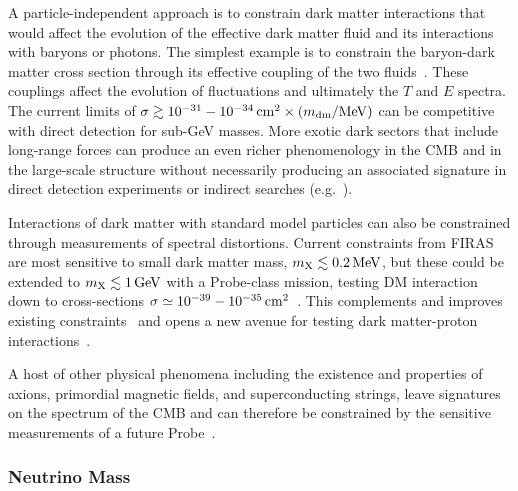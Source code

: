 A particle-independent approach is to constrain dark matter interactions that would 
affect the evolution of the effective dark matter fluid and its interactions with baryons or photons.  The simplest example is 
to constrain the baryon-dark matter cross section through its effective coupling of the two fluids~\cite{Dvorkin:2013cea}.  
These couplings affect the evolution of fluctuations and ultimately the $T$ and $E$ spectra. The current limits of $\sigma \gtrsim 10^{-31}-10^{-34}\,{\rm cm}^2 \times (m_{\rm dm} / {\rm MeV})$ can be competitive with direct detection for sub-GeV masses.  
More exotic dark sectors that include long-range forces can produce an even richer phenomenology in the CMB and in the large-scale structure 
without necessarily producing an associated signature in direct detection experiments or 
indirect searches (e.g.~\cite{Cyr-Racine:2013fsa,Buen-Abad:2015ova,Lesgourgues:2015wza}). 

Interactions of dark matter with standard model particles can also be constrained through 
measurements of spectral distortions\cite{Yacine2015DM}. 
Current constraints from FIRAS are most sensitive to small dark matter
mass, $m_{\rm X}\lesssim 0.2\,{\rm MeV}$, but these could be extended to $m_{\rm X}\lesssim 1\,{\rm GeV}$ with a 
Probe-class mission, testing DM interaction down to cross-sections 
$\sigma\simeq 10^{-39}-10^{-35}\,{\rm cm}^2$~\cite{Yacine2015DM}. This complements and improves 
existing constraints~\cite{Essig2012PhRvL.109b1301E, Boehm2014MNRAS.445L..31B} 
and opens a new avenue for testing dark matter-proton interactions~\cite{Yacine2015DM}.

A host of other physical phenomena including the existence and properties of axions, primordial magnetic fields, and 
superconducting strings, leave signatures on the spectrum of the CMB and can therefore be constrained by 
the sensitive measurements  of a future Probe~\cite[e.g.,][]{Jedamzik2000, Tashiro2012, Dolgov2013, Tashiro2013, Caldwell2013}.


\vspace{-0.15in}

\subsubsection{Neutrino Mass}

